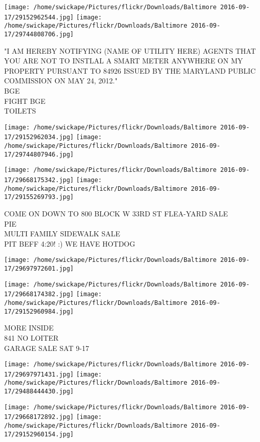 \documentclass[10pt,letterpaper]{article}
\begin{document}
\texttt{[image: /home/swickape/Pictures/flickr/Downloads/Baltimore 2016-09-17/29152962544.jpg]}
\texttt{[image: /home/swickape/Pictures/flickr/Downloads/Baltimore 2016-09-17/29744808706.jpg]}

"I AM HEREBY NOTIFYING (NAME OF UTILITY HERE) AGENTS THAT YOU ARE NOT TO INSTLAL A SMART METER ANYWHERE ON MY PROPERTY PURSUANT TO 84926 ISSUED BY THE MARYLAND PUBLIC COMMISSION ON MAY 24, 2012."\\
BGE\\
FIGHT BGE\\
TOILETS\\
\pagebreak

\texttt{[image: /home/swickape/Pictures/flickr/Downloads/Baltimore 2016-09-17/29152962034.jpg]}
\texttt{[image: /home/swickape/Pictures/flickr/Downloads/Baltimore 2016-09-17/29744807946.jpg]}

\texttt{[image: /home/swickape/Pictures/flickr/Downloads/Baltimore 2016-09-17/29668175342.jpg]}
\texttt{[image: /home/swickape/Pictures/flickr/Downloads/Baltimore 2016-09-17/29155269793.jpg]}

COME ON DOWN TO 800 BLOCK W 33RD ST FLEA{-}YARD SALE\\
PIE\\
MULTI FAMILY SIDEWALK SALE\\
PIT BEFF 4:20! :) WE HAVE HOTDOG\\
\pagebreak

\texttt{[image: /home/swickape/Pictures/flickr/Downloads/Baltimore 2016-09-17/29697972601.jpg]}

\vspace{0.25in}
\texttt{[image: /home/swickape/Pictures/flickr/Downloads/Baltimore 2016-09-17/29668174382.jpg]}
\texttt{[image: /home/swickape/Pictures/flickr/Downloads/Baltimore 2016-09-17/29152960984.jpg]}

MORE INSIDE\\
841 NO LOITER\\
GARAGE SALE SAT 9{-}17\\
\pagebreak

\texttt{[image: /home/swickape/Pictures/flickr/Downloads/Baltimore 2016-09-17/29697971431.jpg]}
\texttt{[image: /home/swickape/Pictures/flickr/Downloads/Baltimore 2016-09-17/29488444430.jpg]}

\texttt{[image: /home/swickape/Pictures/flickr/Downloads/Baltimore 2016-09-17/29668172892.jpg]}
\texttt{[image: /home/swickape/Pictures/flickr/Downloads/Baltimore 2016-09-17/29152960154.jpg]}
\end{document}
